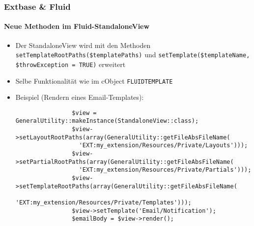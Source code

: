 \begin{frame}[fragile]
	\frametitle{Extbase \& Fluid}
	\framesubtitle{Neue Methoden im Fluid-StandaloneView}

	\lstset{basicstyle=\tiny\ttfamily}

	\begin{itemize}

		\item Der StandaloneView wird mit den Methoden
			\texttt{setTemplateRootPaths(\$templatePaths)} und
			\texttt{setTemplate(\$templateName, \$throwException = TRUE)}
			erweitert

		\item Selbe Funktionalität wie im cObject \texttt{FLUIDTEMPLATE}

		\item Beispiel (Rendern eines Email-Templates):

			\begin{lstlisting}
				$view = GeneralUtility::makeInstance(StandaloneView::class);
				$view->setLayoutRootPaths(array(GeneralUtility::getFileAbsFileName(
				  'EXT:my_extension/Resources/Private/Layouts')));
				$view->setPartialRootPaths(array(GeneralUtility::getFileAbsFileName(
				  'EXT:my_extension/Resources/Private/Partials')));
				$view->setTemplateRootPaths(array(GeneralUtility::getFileAbsFileName(
				  'EXT:my_extension/Resources/Private/Templates')));
				$view->setTemplate('Email/Notification');
				$emailBody = $view->render();
			\end{lstlisting}

	\end{itemize}

\end{frame}


